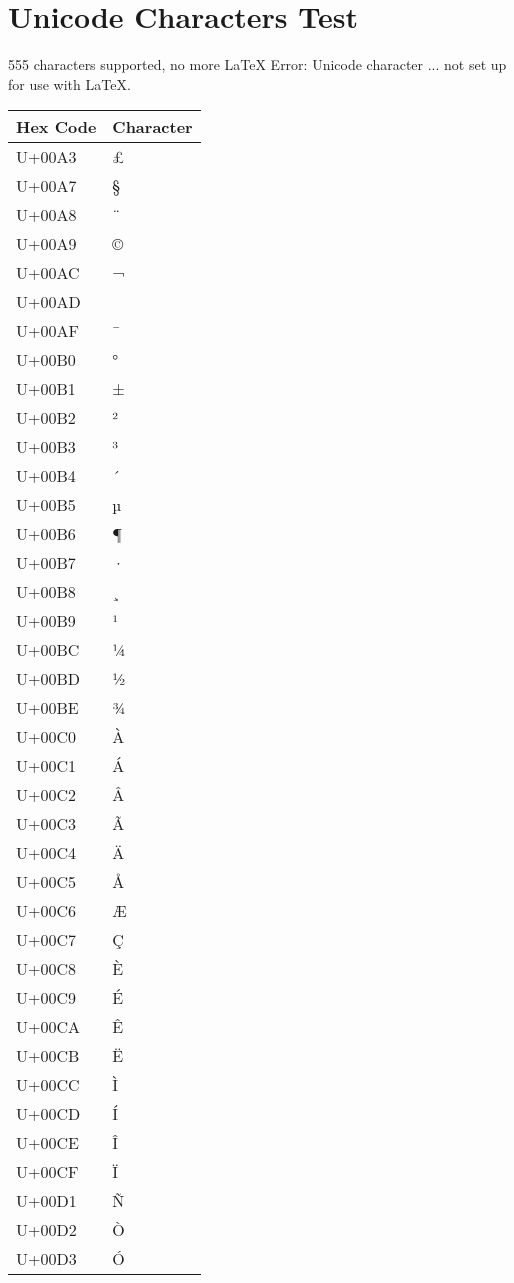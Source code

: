 \documentclass{article}
\begin{document}
\section*{Unicode Characters Test}

555 characters supported, no more LaTeX Error: Unicode character ... not set up for use with LaTeX.

\begin{longtable}{ll}
Hex Code & Character \\
\hline
U+00A3 & £ \\
U+00A7 & § \\
U+00A8 & ¨ \\
U+00A9 & © \\
U+00AC & ¬ \\
U+00AD & ­ \\
U+00AF & ¯ \\
U+00B0 & ° \\
U+00B1 & ± \\
U+00B2 & ² \\
U+00B3 & ³ \\
U+00B4 & ´ \\
U+00B5 & µ \\
U+00B6 & ¶ \\
U+00B7 & · \\
U+00B8 & ¸ \\
U+00B9 & ¹ \\
U+00BC & ¼ \\
U+00BD & ½ \\
U+00BE & ¾ \\
U+00C0 & À \\
U+00C1 & Á \\
U+00C2 & Â \\
U+00C3 & Ã \\
U+00C4 & Ä \\
U+00C5 & Å \\
U+00C6 & Æ \\
U+00C7 & Ç \\
U+00C8 & È \\
U+00C9 & É \\
U+00CA & Ê \\
U+00CB & Ë \\
U+00CC & Ì \\
U+00CD & Í \\
U+00CE & Î \\
U+00CF & Ï \\
U+00D1 & Ñ \\
U+00D2 & Ò \\
U+00D3 & Ó \\

\end{longtable}
\end{document}
